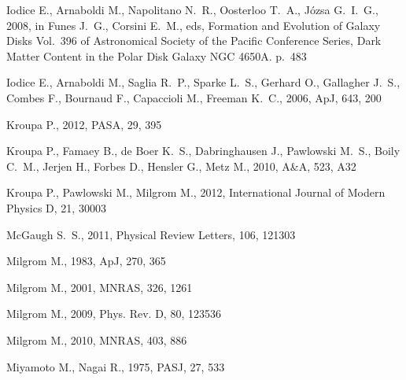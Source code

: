 \documentclass[useAMS,usenatbib]{mn2e}
\newcommand{\mnras}{MNRAS}
\newcommand{\apj}{ApJ}
\newcommand{\aap}{A\&A}
\newcommand{\pasa}{PASA}
\newcommand{\pasj}{PASJ}
\newcommand{\prd}{Phys. Rev. D}
\begin{document}
\begin{thebibliography}{}
{Iodice} E.,  {Arnaboldi} M.,  {Napolitano} N.~R.,  {Oosterloo} T.~A.,
  {J{\'o}zsa} G.~I.~G.,  2008, in {Funes} J.~G.,  {Corsini} E.~M.,  eds,
  Formation and Evolution of Galaxy Disks Vol.~396 of Astronomical Society of
  the Pacific Conference Series, {Dark Matter Content in the Polar Disk Galaxy
  NGC 4650A}.
p.~483

{Iodice} E.,  {Arnaboldi} M.,  {Saglia} R.~P.,  {Sparke} L.~S.,  {Gerhard} O.,
  {Gallagher} J.~S.,  {Combes} F.,  {Bournaud} F.,  {Capaccioli} M.,
  {Freeman} K.~C.,  2006, \apj, 643, 200

{Kroupa} P.,  2012, \pasa, 29, 395

{Kroupa} P.,  {Famaey} B.,  {de Boer} K.~S.,  {Dabringhausen} J.,  {Pawlowski}
  M.~S.,  {Boily} C.~M.,  {Jerjen} H.,  {Forbes} D.,  {Hensler} G.,    {Metz}
  M.,  2010, \aap, 523, A32

{Kroupa} P.,  {Pawlowski} M.,    {Milgrom} M.,  2012, International Journal of
  Modern Physics D, 21, 30003

{McGaugh} S.~S.,  2011, Physical Review Letters, 106, 121303

{Milgrom} M.,  1983, \apj, 270, 365

{Milgrom} M.,  2001, MNRAS, 326, 1261

{Milgrom} M.,  2009, \prd, 80, 123536

{Milgrom} M.,  2010, \mnras, 403, 886

{Miyamoto} M.,  {Nagai} R.,  1975, \pasj, 27, 533


\end{thebibliography}
\end{document}
